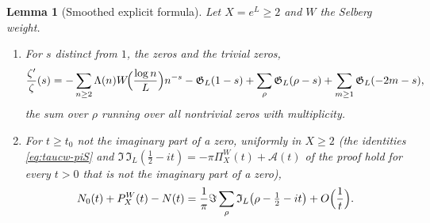 \documentclass[11pt,a4paper]{article}
\numberwithin{equation}{section}
\newtheorem{lemma}[theorem]{Lemma}
\theoremstyle{definition}
\theoremstyle{remark}
\begin{document}
\begin{lemma}[Smoothed explicit formula]\label{lem:taucw-expl}
Let $X=e^L\ge2$ and $W$ the Selberg weight.
\begin{enumerate}[label=(\alph*),leftmargin=*]
\item For $s$ distinct from $1$, the zeros and the trivial zeros,
\begin{equation}\label{eq:taucw-zl}
\frac{\zeta'}{\zeta}(s)=-\sum_{n\ge2}\Lambda(n)W\!\Bigl(\frac{\log n}{L}\Bigr)n^{-s}-\mathfrak G_L(1-s)+\sum_\rho\mathfrak G_L(\rho-s)+\sum_{m\ge1}\mathfrak G_L(-2m-s),
\end{equation}
the sum over $\rho$ running over all nontrivial zeros with multiplicity.
\item For $t\ge t_0$ not the imaginary part of a zero, uniformly in $X\ge2$ (the identities \eqref{eq:taucw-piS} and $\Im\,\mathfrak I_L(\frac12-it)=-\pi\Pi^W_X(t)+\mathscr A(t)$ of the proof hold for every $t>0$ that is not the imaginary part of a zero),
\begin{equation}\label{eq:taucw-expl}
N_0(t)+P_X^W(t)-N(t)=\frac1\pi\Im\sum_\rho\mathfrak I_L\bigl(\rho-\tfrac12-it\bigr)+O\Bigl(\frac1t\Bigr).
\end{equation}
\end{enumerate}
\end{lemma}
\end{document}
